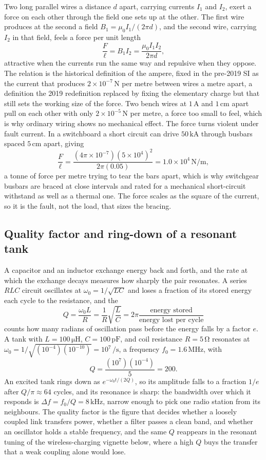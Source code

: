 Two long parallel wires a distance $d$ apart, carrying currents $I_1$ and
$I_2$, exert a force on each other through the field one sets up at the
other. The first wire produces at the second a field $B_1 = \mu_0 I_1/(2\pi
d)$, and the second wire, carrying $I_2$ in that field, feels a force per
unit length
\[
\frac{F}{\ell} = B_1 I_2 = \frac{\mu_0 I_1 I_2}{2\pi d},
\]
attractive when the currents run the same way and repulsive when they
oppose. The relation is the historical definition of the ampere, fixed in
the pre-2019 SI as the current that produces $2\times 10^{-7}\,\si{\newton}$
per metre between wires a metre apart, a definition the 2019 redefinition
replaced by fixing the elementary charge but that still sets the working
size of the force. Two bench wires at $1\,\si{\ampere}$ and $1\,\si{\centi
\meter}$ apart pull on each other with only $2\times 10^{-5}\,\si{\newton}$
per metre, a force too small to feel, which is why ordinary wiring shows no
mechanical effect. The force turns violent under fault current. In a
switchboard a short circuit can drive $50\,\si{\kilo\ampere}$ through
busbars spaced $5\,\si{\centi\meter}$ apart, giving
\[
\frac{F}{\ell} = \frac{(4\pi\times 10^{-7})(5\times 10^{4})^{2}}{2\pi
(0.05)} = 1.0\times 10^{4}\,\si{\newton\per\meter},
\]
a tonne of force per metre trying to tear the bars apart, which is why
switchgear busbars are braced at close intervals and rated for a
mechanical short-circuit withstand as well as a thermal one. The force
scales as the square of the current, so it is the fault, not the load,
that sizes the bracing.

\subsection{Quality factor and ring-down of a resonant tank}

A capacitor and an inductor exchange energy back and forth, and the rate at
which the exchange decays measures how sharply the pair resonates. A series
$RLC$ circuit oscillates at $\omega_0 = 1/\sqrt{LC}$ and loses a fraction of
its stored energy each cycle to the resistance, and the 
\[
Q = \frac{\omega_0 L}{R} = \frac{1}{R}\sqrt{\frac{L}{C}} = 2\pi
\frac{\text{energy stored}}{\text{energy lost per cycle}}
\]
counts how many radians of oscillation pass before the energy falls by a
factor $e$. A tank with $L = 100\,\si{\micro\henry}$, $C = 100\,\si{\pico
\farad}$, and coil resistance $R = 5\,\si{\ohm}$ resonates at $\omega_0 =
1/\sqrt{(10^{-4})(10^{-10})} = 10^{7}\,\si{\per\second}$, a frequency
$f_0 = 1.6\,\si{\mega\hertz}$, with
\[
Q = \frac{(10^{7})(10^{-4})}{5} = 200.
\]
An excited tank rings down as $e^{-\omega_0 t/(2Q)}$, so its amplitude
falls to a fraction $1/e$ after $Q/\pi \approx 64$ cycles, and its
resonance is sharp: the bandwidth over which it responds is $\Delta f =
f_0/Q = 8\,\si{\kilo\hertz}$, narrow enough to pick one radio station from
its neighbours. The quality factor is the figure that decides whether a
loosely coupled link transfers power, whether a filter passes a clean band,
and whether an oscillator holds a stable frequency, and the same $Q$
reappears in the resonant tuning of the wireless-charging vignette below,
where a high $Q$ buys the transfer that a weak coupling alone would lose.

